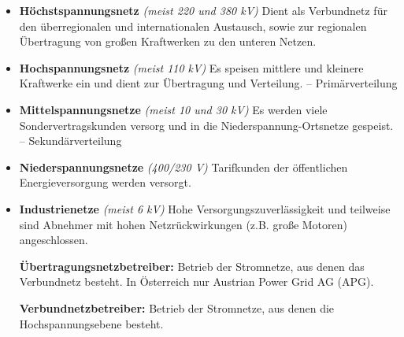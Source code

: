 \begin{itemize}
    \item \textbf{Höchstspannungsnetz} \textit{(meist 220 und 380 kV)}
    \newline Dient als Verbundnetz für den überregionalen und internationalen Austausch, sowie zur regionalen Übertragung von großen Kraftwerken zu den unteren Netzen.
    \item \textbf{Hochspannungsnetz} \textit{(meist 110 kV)}
    \newline Es speisen mittlere und kleinere Kraftwerke ein und dient zur Übertragung und Verteilung. – Primärverteilung
    \item \textbf{Mittelspannungsnetze} \textit{(meist 10 und 30 kV)}
    \newline Es werden viele Sondervertragskunden versorg und in die Niederspannung-Ortsnetze gespeist. – Sekundärverteilung
    \item \textbf{Niederspannungsnetze} \textit{(400/230 V)}
    \newline Tarifkunden der öffentlichen Energieversorgung werden versorgt.
    \item \textbf{Industrienetze} \textit{(meist 6 kV)}
    \newline Hohe Versorgungszuverlässigkeit und teilweise sind Abnehmer mit hohen Netzrückwirkungen (z.B. große Motoren) angeschlossen.
\end{itemize}

\vspace{1em}


\vspace{2em}

\begin{itemize}
    \item[\textbf{Übertragungsnetzbetreiber:}] Betrieb der Stromnetze, aus denen das Verbundnetz besteht. In Österreich nur Austrian Power Grid AG (APG).
    \item[\textbf{Verbundnetzbetreiber:}] Betrieb der Stromnetze, aus denen die Hochspannungsebene besteht.
\end{itemize}

